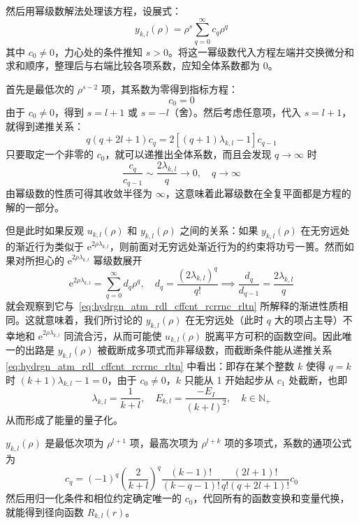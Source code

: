 \documentclass[cn,10pt,math=newtx,citestyle=gb7714-2015,bibstyle=gb7714-2015]{elegantbook}
\def\e{\mathrm e}
\def\N{\mathbb N}
\def\ra{\rightarrow}
\begin{document}
然后用幂级数解法处理该方程，设展式：
\begin{equation}
    y_{k,l}(\rho) = \rho^s\sum_{q=0}^{\infty}c_q\rho^q
\end{equation}
其中 $c_0\ne 0$，力心处的条件推知 $s>0$。将这一幂级数代入方程左端并交换微分和求和顺序，整理后与右端比较各项系数，应知全体系数都为 0。

首先是最低次的 $\rho^{s-2}$ 项，其系数为零得到指标方程：
\begin{equation}
    [-l(l+1)+s(s-1)]c_0=0
\end{equation}
由于 $c_0\ne 0$，得到 $s=l+1$ 或 $s=-l$（舍）。然后考虑任意项，代入 $s=l+1$，就得到递推关系：
\begin{equation}
    q(q+2l+1)c_q = 2[(q+1)\lambda_{k,l}-1]c_{q-1}
\end{equation}
只要取定一个非零的 $c_0$，就可以递推出全体系数，而且会发现 $q\ra\infty$ 时
\begin{equation}\label{eq:hydrgn_atm_rdl_cffcnt_rcrrnc_rltn}
    \frac{c_q}{c_{q-1}}\sim\frac{2\lambda_{k,l}} q\ra 0,\quad q\ra\infty
\end{equation}
由幂级数的性质可得其收敛半径为 $\infty$，这意味着此幂级数在全复平面都是方程的解的一部分。

但是此时如果反观 $u_{k,l}(\rho)$ 和 $y_{k,l}(\rho)$ 之间的关系：如果 $y_{k,l}(\rho)$ 在无穷远处的渐近行为类似于 $\e^{2\rho\lambda_{k,l}}$，则前面对无穷远处渐近行为的约束将功亏一篑。然而如果对所担心的 $\e^{2\rho\lambda_{k,l}}$ 幂级数展开
\begin{equation}
    \e^{2\rho\lambda_{k,l}} = \sum_{q=0}^\infty d_q\rho^q,\quad d_q = \frac{(2\lambda_{k,l})^q}{q!}\implies\frac{d_q}{d_{q-1}} = \frac{2\lambda_{k,l}} q
\end{equation}
就会观察到它与~\ref{eq:hydrgn_atm_rdl_cffcnt_rcrrnc_rltn} 所解释的渐进性质相同。这就意味着，我们所讨论的 $y_{k,l}(\rho)$ 在无穷远处（此时 $q$ 大的项占主导）不幸地和 $\e^{2\rho\lambda_{k,l}}$ 同流合污，从而可能使 $u_{k,l}(\rho)$ 脱离平方可积的函数空间。因此唯一的出路是 $y_{k,l}(\rho)$ 被截断成多项式而非幂级数，而截断条件能从递推关系 \ref{eq:hydrgn_atm_rdl_cffcnt_rcrrnc_rltn} 中看出：即存在某个整数 $k$ 使得 $q=k$ 时 $(k+1)\lambda_{k,l}-1=0$，由于 $c_0\ne 0$，$k$ 只能从 1 开始起步从 $c_1$ 处截断，也即
\begin{equation}\label{eq:hydrgn_atm_enrgy_egnvl}
    \lambda_{k,l} = \frac 1{k+l},\quad E_{k,l} = \frac{-E_I}{(k+l)^2},\quad k\in \N_+
\end{equation}
从而形成了能量的量子化。

\begin{conclusion}
$y_{k,l}(\rho)$ 是最低次项为 $\rho^{l+1}$ 项，最高次项为 $\rho^{l+k}$ 项的多项式，系数的通项公式为
\begin{equation}
    c_q=(-1)^q\left(\frac 2{k+l}\right)^q\frac{(k-1)!}{(k-q-1)!}\frac{(2l+1)!}{q!(q+2l+1)!}c_0
\end{equation}
然后用归一化条件和相位约定确定唯一的 $c_0$，代回所有的函数变换和变量代换，就能得到径向函数 $R_{k,l}(r)$。
\end{conclusion}
\end{document}
